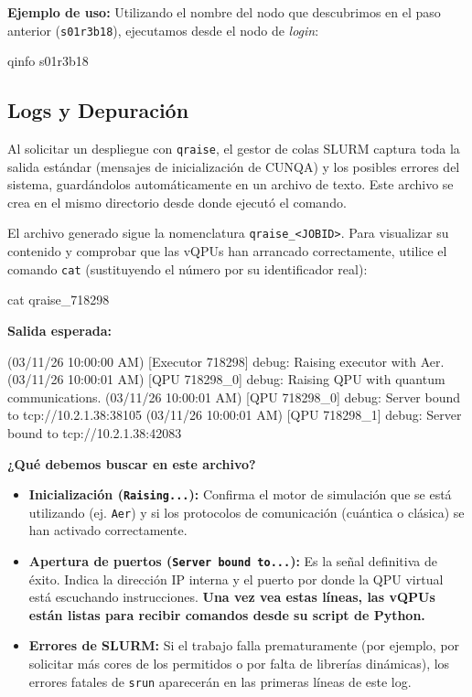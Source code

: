 \documentclass[a4paper,11pt]{article}
\begin{document}
\textbf{Ejemplo de uso:}
Utilizando el nombre del nodo que descubrimos en el paso anterior (\texttt{s01r3b18}), ejecutamos desde el nodo de \textit{login}:

\begin{terminal}
qinfo s01r3b18
\end{terminal}


\subsection{Logs y Depuración}

Al solicitar un despliegue con \texttt{qraise}, el gestor de colas SLURM captura toda la salida estándar (mensajes de inicialización de CUNQA) y los posibles errores del sistema, guardándolos automáticamente en un archivo de texto. Este archivo se crea en el mismo directorio desde donde ejecutó el comando.

El archivo generado sigue la nomenclatura \texttt{qraise\_<JOBID>}. Para visualizar su contenido y comprobar que las vQPUs han arrancado correctamente, utilice el comando \texttt{cat} (sustituyendo el número por su identificador real):

\begin{terminal}
cat qraise_718298
\end{terminal}

\textbf{Salida esperada:}
\begin{terminal}[listing options={columns=fixed, basicstyle=\color{gray!80}\ttfamily\small, literate={}}]
(03/11/26 10:00:00 AM) [Executor 718298] debug: Raising executor 
with Aer.
(03/11/26 10:00:01 AM) [QPU 718298_0] debug: Raising QPU with quantum 
communications.
(03/11/26 10:00:01 AM) [QPU 718298_0] debug: Server bound to 
tcp://10.2.1.38:38105
(03/11/26 10:00:01 AM) [QPU 718298_1] debug: Server bound to 
tcp://10.2.1.38:42083
\end{terminal}

\vspace{0.3cm}
\textbf{¿Qué debemos buscar en este archivo?}
\begin{itemize}
    \item \textbf{Inicialización (\texttt{Raising...}):} Confirma el motor de simulación que se está utilizando (ej. \texttt{Aer}) y si los protocolos de comunicación (cuántica o clásica) se han activado correctamente.
    \item \textbf{Apertura de puertos (\texttt{Server bound to...}):} Es la señal definitiva de éxito. Indica la dirección IP interna y el puerto por donde la QPU virtual está escuchando instrucciones. \textbf{Una vez vea estas líneas, las vQPUs están listas para recibir comandos desde su script de Python.}
    \item \textbf{Errores de SLURM:} Si el trabajo falla prematuramente (por ejemplo, por solicitar más cores de los permitidos o por falta de librerías dinámicas), los errores fatales de \texttt{srun} aparecerán en las primeras líneas de este log.
\end{itemize}
\end{document}

